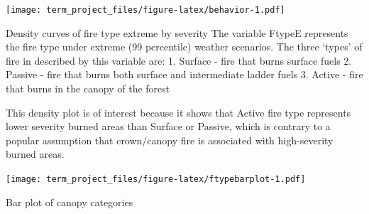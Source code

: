 \documentclass[]{book}
\newenvironment{Shaded}{\begin{snugshade}}{\end{snugshade}}
\newcommand{\DataTypeTok}[1]{\textcolor[rgb]{0.13,0.29,0.53}{#1}}
\newcommand{\DecValTok}[1]{\textcolor[rgb]{0.00,0.00,0.81}{#1}}
\newcommand{\KeywordTok}[1]{\textcolor[rgb]{0.13,0.29,0.53}{\textbf{#1}}}
\newcommand{\NormalTok}[1]{#1}
\newcommand{\OperatorTok}[1]{\textcolor[rgb]{0.81,0.36,0.00}{\textbf{#1}}}
\newcommand{\StringTok}[1]{\textcolor[rgb]{0.31,0.60,0.02}{#1}}
\begin{document}
\texttt{[image: term\_project\_files/figure-latex/behavior-1.pdf]}

Density curves of fire type extreme by severity
The variable FtypeE represents the fire type under extreme (99 percentile) weather scenarios.
The three `types' of fire in described by this variable are:
1. Surface - fire that burns surface fuels
2. Passive - fire that burns both surface and intermediate ladder fuels
3. Active - fire that burns in the canopy of the forest

This density plot is of interest because it shows that Active fire type represents lower severity burned areas than
Surface or Passive, which is contrary to a popular assumption that crown/canopy fire is associated with high-severity
burned areas.

\begin{Shaded}
\end{Shaded}

\texttt{[image: term\_project\_files/figure-latex/ftypebarplot-1.pdf]}

Bar plot of canopy categories
\end{document}
